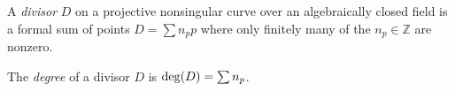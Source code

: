 \documentclass[12pt]{article}
\begin{document}
A {\em divisor} $D$ on a projective nonsingular curve over an algebraically closed field is a formal sum of points $D = \sum n_p p$ where only finitely many of the $n_p\in\mathbb{Z}$ are nonzero.

The {\em degree} of a divisor $D$ is ${\rm deg}(D) = \sum n_p$.
\end{document}
